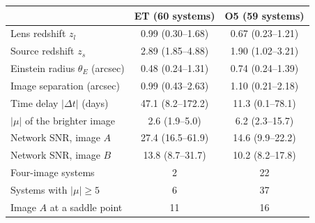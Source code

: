 \begin{tabular*}{\linewidth}{@{\extracolsep{\fill}}lcc@{}}
\toprule
 & ET (60 systems) & O5 (59 systems)\\
\midrule
Lens redshift $z_l$ & 0.99 (0.30--1.68) & 0.67 (0.23--1.21)\\
Source redshift $z_s$ & 2.89 (1.85--4.88) & 1.90 (1.02--3.21)\\
Einstein radius $\theta_E$ (arcsec) & 0.48 (0.24--1.31) & 0.74 (0.24--1.39)\\
Image separation (arcsec) & 0.99 (0.43--2.63) & 1.10 (0.21--2.18)\\
Time delay $|\Delta t|$ (days) & 47.1 (8.2--172.2) & 11.3 (0.1--78.1)\\
$|\mu|$ of the brighter image & 2.6 (1.9--5.0) & 6.2 (2.3--15.7)\\
Network SNR, image $A$ & 27.4 (16.5--61.9) & 14.6 (9.9--22.2)\\
Network SNR, image $B$ & 13.8 (8.7--31.7) & 10.2 (8.2--17.8)\\
Four-image systems & 2 & 22\\
Systems with $|\mu|\ge5$ & 6 & 37\\
Image $A$ at a saddle point & 11 & 16\\
\bottomrule
\end{tabular*}
